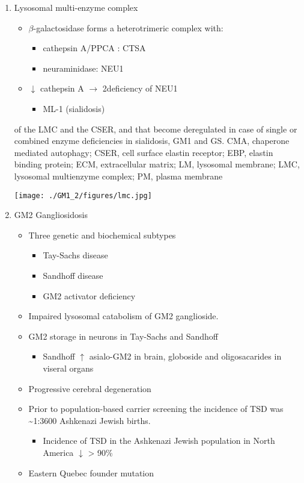 \documentclass{scrartcl}
\begin{document}
\begin{enumerate}
\item Lysosomal multi-enzyme complex
\label{sec:org657afa7}

\begin{itemize}
\item \(\beta\)-galactosidase forms a heterotrimeric complex with:
\begin{itemize}
\item cathepsin A/PPCA : CTSA
\item neuraminidase: NEU1
\end{itemize}

\item \(\downarrow\) cathepsin A \(\to\) 2\degree  deficiency of NEU1
\begin{itemize}
\item ML-1 (sialidosis)
\end{itemize}
\end{itemize}

of the LMC and the CSER, and that become deregulated in case of
single or combined enzyme deficiencies in sialidosis, GM1 and
GS. CMA, chaperone mediated autophagy; CSER, cell surface elastin
receptor; EBP, elastin binding protein; ECM, extracellular matrix;
LM, lysosomal membrane; LMC, lysosomal multienzyme complex; PM,
plasma membrane
\begin{center}
\texttt{[image: ./GM1\_2/figures/lmc.jpg]}
\label{org57d9985}
\end{center}

\item GM2 Gangliosidosis
\label{sec:org97636c0}
\begin{itemize}
\item Three genetic and biochemical subtypes
\begin{itemize}
\item Tay-Sachs disease
\item Sandhoff disease
\item GM2 activator deficiency
\end{itemize}
\item Impaired lysosomal catabolism of GM2 ganglioside.
\item GM2 storage in neurons in Tay-Sachs and Sandhoff
\begin{itemize}
\item Sandhoff \(\uparrow\) asialo-GM2 in brain, globoside and oligosacarides in viseral organs
\end{itemize}
\item Progressive cerebral degeneration
\item Prior to population-based carrier screening the incidence of TSD was \textasciitilde{}1:3600 Ashkenazi Jewish births.
\begin{itemize}
\item Incidence of TSD in the Ashkenazi Jewish population in North America \(\downarrow\) > 90\%
\end{itemize}
\item Eastern Quebec founder mutation
\end{itemize}



\end{enumerate}
\end{document}
